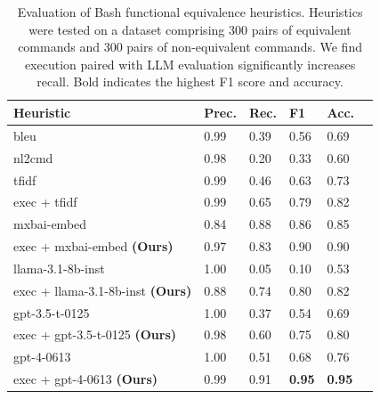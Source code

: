 \documentclass[11pt]{article}
\begin{document}
\begin{table}[ht!]
  \centering
  \scriptsize
  \caption{Evaluation of Bash functional equivalence heuristics. Heuristics were tested on a dataset comprising 300 pairs of equivalent commands and 300 pairs of non-equivalent commands. We find execution paired with LLM evaluation significantly increases recall. Bold indicates the highest F1 score and accuracy.}
  \begin{tabular}{llllll}
    \hline
    \textbf{Heuristic}                       & \textbf{Prec.} & \textbf{Rec.} & \textbf{F1}   & \textbf{Acc.} \\
    \hline
    bleu \cite{bleu}                         & 0.99           & 0.39          & 0.56          & 0.69          \\
    nl2cmd \cite{NL2CMD-Comp}                & 0.98           & 0.20          & 0.33          & 0.60          \\ \hline
    tfidf \cite{tfidf}                       & 0.99           & 0.46          & 0.63          & 0.73          \\
    exec + tfidf \cite{InterCode}            & 0.99           & 0.65          & 0.79          & 0.82          \\ \hline
    mxbai-embed   \cite{mxbai}               & 0.84           & 0.88          & 0.86          & 0.85          \\
    exec + mxbai-embed \textbf{(Ours)}       & 0.97           & 0.83          & 0.90          & 0.90          \\ \hline
    llama-3.1-8b-inst \cite{llama3}          & 1.00           & 0.05          & 0.10          & 0.53          \\
    exec + llama-3.1-8b-inst \textbf{(Ours)} & 0.88           & 0.74          & 0.80          & 0.82          \\ \hline
    gpt-3.5-t-0125  \cite{gpt3}              & 1.00           & 0.37          & 0.54          & 0.69          \\
    exec + gpt-3.5-t-0125 \textbf{(Ours)}    & 0.98           & 0.60          & 0.75          & 0.80          \\ \hline
    gpt-4-0613 \cite{tsed}                   & 1.00           & 0.51          & 0.68          & 0.76          \\
    exec + gpt-4-0613 \textbf{(Ours)}        & 0.99           & 0.91          & \textbf{0.95} & \textbf{0.95} \\
    \hline
  \end{tabular}
  \label{tab:feh_results}
\end{table}
\end{document}
